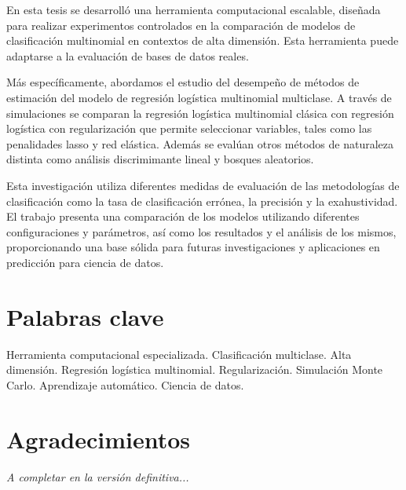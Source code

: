 \documentclass{report}
\begin{document}
	 
		En esta tesis se desarrolló una herramienta computacional escalable, diseñada para realizar experimentos controlados en la comparación de modelos de clasificación multinomial en contextos de alta dimensión.  Esta herramienta puede adaptarse a la evaluación de bases de datos reales. 
		
		 Más específicamente, abordamos el estudio del desempeño de métodos de estimación del modelo de regresión logística multinomial multiclase.  A través de simulaciones se comparan la regresión logística multinomial clásica con regresión logística con regularización que permite seleccionar variables, tales como las penalidades lasso y red elástica. Además se evalúan otros  métodos de naturaleza distinta como análisis discrimimante lineal y bosques aleatorios.
		
		Esta investigación utiliza diferentes medidas de evaluación de las metodologías de clasificación como la tasa de clasificación errónea,  la precisión y la exahustividad. El trabajo presenta una comparación de los modelos utilizando diferentes configuraciones y parámetros, así como los resultados y el análisis de los mismos, proporcionando una base sólida para futuras investigaciones y aplicaciones en predicción para ciencia de datos. 
		
	
		
		
		\vspace{1cm}
		\noindent \textsl{}
		\section*{Palabras clave} 	
		 
			
		Herramienta computacional especializada. Clasificación multiclase. Alta dimensión.  Regresión logística multinomial. Regularización. Simulación Monte Carlo.   Aprendizaje automático. Ciencia de datos. 
		

 


		
		 
		
		
		\newpage
		\section*{Agradecimientos} 
		\begin{spacing}{1.5}{\it  A completar en la versión definitiva... }
			
			
			
			
		\end{spacing}
		
\end{document}
